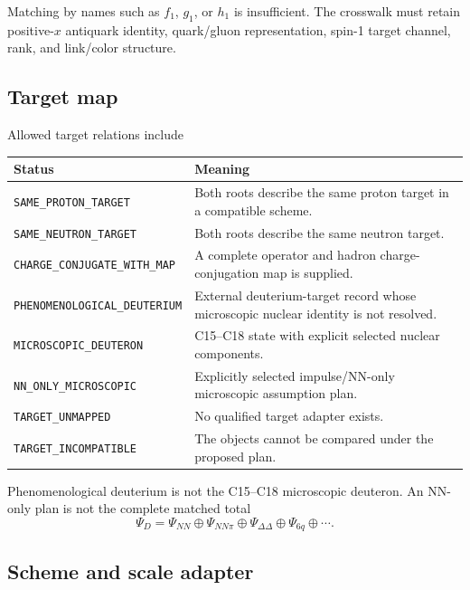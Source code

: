 \documentclass[11pt]{article}
\begin{document}
Matching by names such as \(f_1\), \(g_1\), or \(h_1\) is insufficient.  The crosswalk must retain positive-\(x\) antiquark identity, quark/gluon representation, spin-1 target channel, rank, and link/color structure.

\subsection{Target map}

Allowed target relations include
\begin{center}
\begin{tabularx}{0.94\textwidth}{L{0.34\textwidth}Y}
\toprule
Status & Meaning\\
\midrule
\texttt{SAME\_PROTON\_TARGET} & Both roots describe the same proton target in a compatible scheme.\\
\texttt{SAME\_NEUTRON\_TARGET} & Both roots describe the same neutron target.\\
\texttt{CHARGE\_CONJUGATE\_WITH\_MAP} & A complete operator and hadron charge-conjugation map is supplied.\\
\texttt{PHENOMENOLOGICAL\_DEUTERIUM} & External deuterium-target record whose microscopic nuclear identity is not resolved.\\
\texttt{MICROSCOPIC\_DEUTERON} & C15--C18 state with explicit selected nuclear components.\\
\texttt{NN\_ONLY\_MICROSCOPIC} & Explicitly selected impulse/NN-only microscopic assumption plan.\\
\texttt{TARGET\_UNMAPPED} & No qualified target adapter exists.\\
\texttt{TARGET\_INCOMPATIBLE} & The objects cannot be compared under the proposed plan.\\
\bottomrule
\end{tabularx}
\end{center}

Phenomenological deuterium is not the C15--C18 microscopic deuteron.  An NN-only plan is not the complete matched total
\begin{equation}
 \Psi_D
 =
 \Psi_{NN}
 \oplus\Psi_{NN\pi}
 \oplus\Psi_{\Delta\Delta}
 \oplus\Psi_{6q}
 \oplus\cdots.
 \label{eq:deuteron-components}
\end{equation}

\subsection{Scheme and scale adapter}
\end{document}
